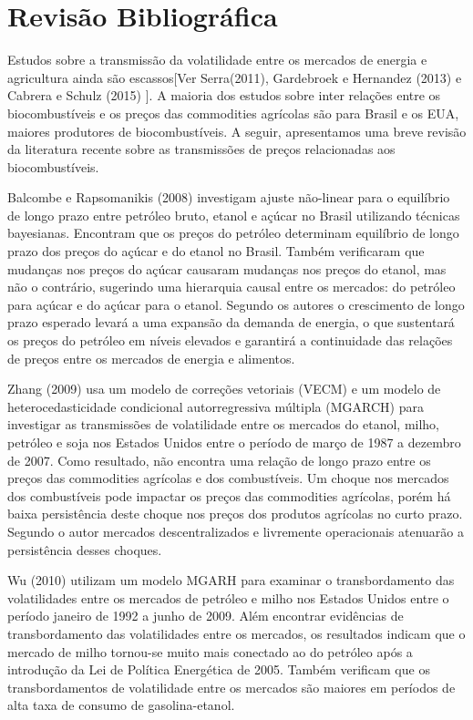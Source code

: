 \documentclass[a4paper,12pt] {article}
\begin{document}
	
\section{Revisão Bibliográfica}
		
	Estudos sobre a transmissão da  volatilidade entre os mercados de energia e agricultura ainda são escassos[Ver Serra(2011), Gardebroek e Hernandez (2013) e Cabrera e Schulz (2015) ]. A maioria dos estudos sobre inter relações entre os biocombustíveis e os preços das commodities agrícolas são para  Brasil e os EUA,  maiores produtores de biocombustíveis. A seguir, apresentamos uma breve revisão  da literatura recente sobre as transmissões de preços relacionadas aos biocombustíveis.   
	
	Balcombe e Rapsomanikis (2008) investigam  ajuste não-linear para o equilíbrio de longo prazo entre petróleo bruto, etanol e açúcar no Brasil utilizando técnicas bayesianas.  Encontram que os preços do petróleo determinam equilíbrio de longo prazo dos preços do açúcar e do etanol no Brasil. Também verificaram que mudanças nos preços do açúcar causaram mudanças nos preços do etanol, mas não o contrário, sugerindo uma hierarquia causal entre os mercados: do petróleo para açúcar e do açúcar para o etanol. Segundo os autores o crescimento de longo prazo esperado levará a uma expansão da demanda de energia, o que sustentará os preços do petróleo em níveis elevados e garantirá a continuidade das relações de preços entre os mercados de energia e alimentos. 
	
	Zhang (2009) usa um modelo de correções vetoriais (VECM) e um modelo de heterocedasticidade  condicional autorregressiva múltipla (MGARCH) para investigar as transmissões de volatilidade entre os mercados do etanol, milho, petróleo e soja nos Estados Unidos entre o período de março de 1987 a dezembro de 2007. Como resultado, não encontra uma relação de longo prazo entre os preços das commodities agrícolas e dos combustíveis. Um choque nos mercados dos combustíveis pode impactar os preços das commodities agrícolas, porém há baixa persistência deste choque nos preços dos produtos agrícolas no curto prazo.  Segundo o autor  mercados descentralizados e livremente operacionais atenuarão a persistência desses choques.
	
	Wu (2010) utilizam um modelo MGARH para examinar o transbordamento das volatilidades entre os mercados de petróleo e milho nos Estados Unidos entre o período janeiro de 1992 a junho de 2009. Além  encontrar evidências de transbordamento das volatilidades entre os mercados, os  resultados indicam que o mercado de milho tornou-se muito mais conectado ao  do petróleo após a introdução da Lei de Política Energética de 2005. Também verificam que os transbordamentos de volatilidade entre os mercados são maiores em períodos de alta taxa de consumo de gasolina-etanol. 
	
\end{document}
